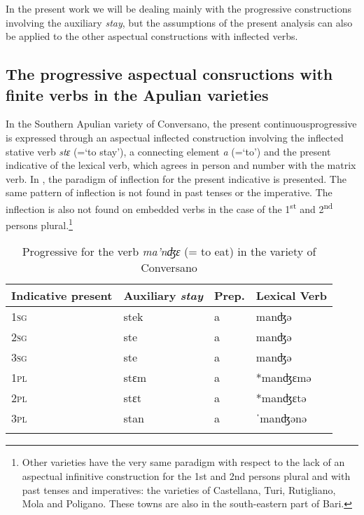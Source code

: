\documentclass[output=paper]{langsci/langscibook}
\begin{document}
In the present work we will be dealing mainly with the progressive constructions involving the auxiliary \textit{stay}, but the assumptions of the present analysis can also be applied to the other aspectual constructions with inflected verbs.

\subsection{The progressive aspectual consructions with finite verbs in the Apulian varieties}%

In the Southern Apulian variety of Conversano, the present continuousprogressive is expressed through an aspectual inflected construction involving the inflected stative verb \textit{stɛ} (=‘to stay’), a connecting element \textit{a} (=‘to’) and the present indicative of the lexical verb, which agrees in person and number with the matrix verb. In , the paradigm of inflection for the present indicative is presented. The same pattern of inflection is not found in past tenses or the imperative. The inflection is also not found on embedded verbs in the case of the 1\textsuperscript{st} and 2\textsuperscript{nd} persons plural.\footnote{Other varieties have the very same paradigm with respect to the lack of an aspectual infinitive construction for the 1st and 2nd persons plural and with past tenses and imperatives: the varieties of Castellana, Turi, Rutigliano, Mola and Poligano. These towns are also in the south-eastern part of Bari.} 

\begin{table}
\begin{tabular}{*{4}{l}}
\lsptoprule
Indicative present & Auxiliary \textit{stay} & Prep. & Lexical Verb\\\midrule
\scshape 1sg & stek & a & manʤə\\
\scshape 2sg & ste & a & manʤə\\
\scshape 3sg & ste & a & manʤə\\
\scshape 1pl & stɛm & a & *manʤɛmə\\
\scshape 2pl & stɛt & a & *manʤɛtə\\
\scshape 3pl & stan & a & ˈmanʤənə\\
\lspbottomrule
\end{tabular}
\caption{Progressive for the verb \textit{ma’nʤɛ} (= to eat) in the variety of Conversano\label{tab:lorusso:1}}
\end{table}
\end{document}
